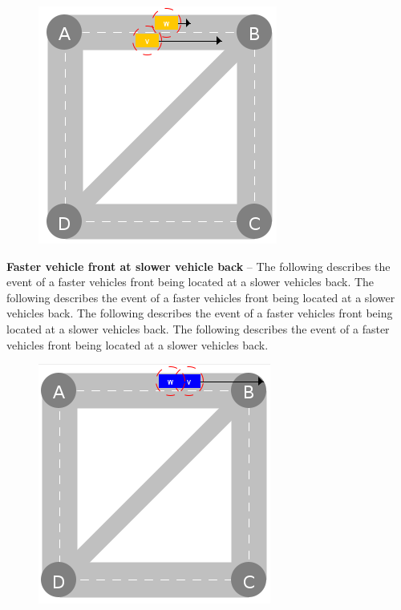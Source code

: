 \documentclass[graybox]{svmult}
\begin{document}
\begin{figure}
	\centering
	\includegraphics[scale=0.35]{../../events/faster-vehicle-front-at-slower-vehicle-back.png}
\end{figure}

\noindent
\textbf{Faster vehicle front at slower vehicle back}
--
The following describes the event of a faster vehicles front being located at a slower vehicles back.
The following describes the event of a faster vehicles front being located at a slower vehicles back.
The following describes the event of a faster vehicles front being located at a slower vehicles back.
The following describes the event of a faster vehicles front being located at a slower vehicles back.

\vspace{4mm}
\begin{figure}
	\centering
	\includegraphics[scale=0.35]{../../events/slower-vehicle-front-at-faster-vehicle-back.png}
\end{figure}
\end{document}
